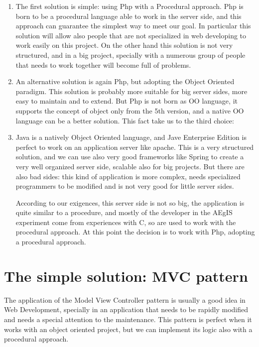 \begin{enumerate}

\item
The first solution is simple: using Php with a Procedural approach. Php is born to be a procedural language able to work in the server side, and this approach can guarantee the simplest way to meet our goal. In particular this solution will allow also people that are not specialized in web developing to work easily on this project. On the other hand this solution is not very structured, and in a big project, specially with a numerous group of people that needs to work together will become full of problems.

\item
An alternative solution is again Php, but adopting the Object Oriented paradigm. This solution is probably more suitable for big server sides, more easy to maintain and to extend. But Php is not born as OO language, it supports the concept of object only from the 5th version, and a native OO language can be a better solution. This fact take us to the third choice:

\item
Java is a natively Object Oriented language, and Jave Enterprise Edition is perfect to work on an application server like apache. This is a very structured solution, and we can use also very good frameworks like Spring to create a very well organized server side, scalable also for big projects. But there are also bad sides: this kind of application is more complex, needs specialized programmers to be modified and is not very good for little server sides. 

According to our exigences, this server side is not so big, the application is quite similar to a procedure, and mostly of the developer in the AEgIS experiment come from experiences with C, so are used to work with the procedural approach. At this point the decision is to work with Php, adopting a procedural approach.  

\end{enumerate}
 
\section{The simple solution: MVC pattern}

The application of the Model View Controller pattern is usually a good idea in Web Development, specially in an application that needs to be rapidly modified and needs a special attention to the maintenance. This pattern is perfect when it works with an object oriented project, but we can implement its logic also with a procedural approach.

